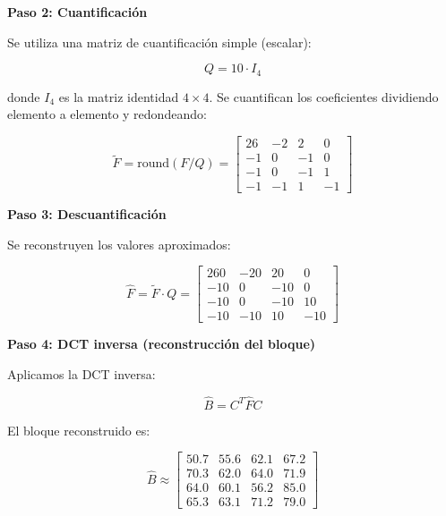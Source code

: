 \documentclass[8pt,a4paper]{article}
\theoremstyle{definition}
\theoremstyle{remark}
\begin{document}
\begin{multicols}{2}
            \textbf{Paso 2: Cuantificación}
            
            Se utiliza una matriz de cuantificación simple (escalar):
            
            \[
            Q = 10 \cdot I_4
            \]
            
            donde \( I_4 \) es la matriz identidad \( 4 \times 4 \). Se cuantifican los coeficientes dividiendo elemento a elemento y redondeando:
            
            \[
            \tilde{F} = \text{round}(F / Q) =
            \begin{bmatrix}
            26 & -2 & 2 & 0 \\
            -1 & 0 & -1 & 0 \\
            -1 & 0 & -1 & 1 \\
            -1 & -1 & 1 & -1
            \end{bmatrix}
            \]
            
            \textbf{Paso 3: Descuantificación}
            
            Se reconstruyen los valores aproximados:
            
            \[
            \hat{F} = \tilde{F} \cdot Q =
            \begin{bmatrix}
            260 & -20 & 20 & 0 \\
            -10 & 0 & -10 & 0 \\
            -10 & 0 & -10 & 10 \\
            -10 & -10 & 10 & -10
            \end{bmatrix}
            \]
            
            \textbf{Paso 4: DCT inversa (reconstrucción del bloque)}
            
            Aplicamos la DCT inversa:
            
            \[
            \hat{B} = C^T \hat{F} C
            \]
            
            El bloque reconstruido es:
            
            \[
            \hat{B} \approx
            \begin{bmatrix}
            50.7 & 55.6 & 62.1 & 67.2 \\
            70.3 & 62.0 & 64.0 & 71.9 \\
            64.0 & 60.1 & 56.2 & 85.0 \\
            65.3 & 63.1 & 71.2 & 79.0
            \end{bmatrix}
            \]
            

\end{multicols}
\end{document}
